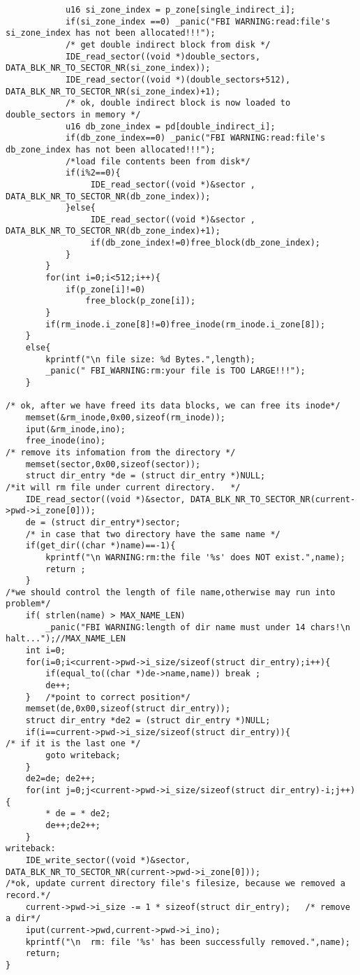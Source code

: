 \begin{verbatim}
			u16 si_zone_index = p_zone[single_indirect_i];
			if(si_zone_index ==0) _panic("FBI WARNING:read:file's si_zone_index has not been allocated!!!");
			/* get double indirect block from disk */
			IDE_read_sector((void *)double_sectors, DATA_BLK_NR_TO_SECTOR_NR(si_zone_index));
			IDE_read_sector((void *)(double_sectors+512), DATA_BLK_NR_TO_SECTOR_NR(si_zone_index)+1);
			/* ok, double indirect block is now loaded to double_sectors in memory */	
			u16 db_zone_index = pd[double_indirect_i];
  			if(db_zone_index==0) _panic("FBI WARNING:read:file's db_zone_index has not been allocated!!!");
			/*load file contents been from disk*/
			if(i%2==0){
				 IDE_read_sector((void *)&sector , DATA_BLK_NR_TO_SECTOR_NR(db_zone_index));
			}else{
				 IDE_read_sector((void *)&sector , DATA_BLK_NR_TO_SECTOR_NR(db_zone_index)+1);
				 if(db_zone_index!=0)free_block(db_zone_index);
			}
		}
		for(int i=0;i<512;i++){
			if(p_zone[i]!=0)
				free_block(p_zone[i]);
		}
		if(rm_inode.i_zone[8]!=0)free_inode(rm_inode.i_zone[8]);
	}
	else{
		kprintf("\n file size: %d Bytes.",length);
		_panic(" FBI_WARNING:rm:your file is TOO LARGE!!!");
	}

/* ok, after we have freed its data blocks, we can free its inode*/
	memset(&rm_inode,0x00,sizeof(rm_inode));
	iput(&rm_inode,ino);
	free_inode(ino); 
/* remove its infomation from the directory */
	memset(sector,0x00,sizeof(sector));
	struct dir_entry *de = (struct dir_entry *)NULL;
/*it will rm file under current directory.   */
	IDE_read_sector((void *)&sector, DATA_BLK_NR_TO_SECTOR_NR(current->pwd->i_zone[0]));	
	de = (struct dir_entry*)sector; 
	/* in case that two directory have the same name */
	if(get_dir((char *)name)==-1){
		kprintf("\n WARNING:rm:the file '%s' does NOT exist.",name);
		return ;
	}
/*we should control the length of file name,otherwise may run into problem*/
	if( strlen(name) > MAX_NAME_LEN) 
		_panic("FBI WARNING:length of dir name must under 14 chars!\n halt...");//MAX_NAME_LEN		
	int i=0;
	for(i=0;i<current->pwd->i_size/sizeof(struct dir_entry);i++){
		if(equal_to((char *)de->name,name)) break ;
		de++;
	}	/*point to correct position*/
	memset(de,0x00,sizeof(struct dir_entry));
	struct dir_entry *de2 = (struct dir_entry *)NULL;
	if(i==current->pwd->i_size/sizeof(struct dir_entry)){
/* if it is the last one */		
		goto writeback;
	}
	de2=de; de2++;
	for(int j=0;j<current->pwd->i_size/sizeof(struct dir_entry)-i;j++){
		* de = * de2;
		de++;de2++;
	}
writeback:
	IDE_write_sector((void *)&sector, DATA_BLK_NR_TO_SECTOR_NR(current->pwd->i_zone[0]));	
/*ok, update current directory file's filesize, because we removed a record.*/	
	current->pwd->i_size -= 1 * sizeof(struct dir_entry);	/* remove a dir*/
	iput(current->pwd,current->pwd->i_ino);
	kprintf("\n  rm: file '%s' has been successfully removed.",name);
	return;
}

\end{verbatim}





